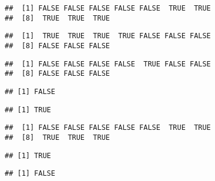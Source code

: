 \documentclass[paper=a4,10pt,div=17,headsepline,BCOR=12mm,twoside,open=right]{scrbook}\usepackage{knitr}
\begin{document}
\begin{knitrout}\footnotesize
{}\color{fgcolor}\begin{kframe}
\begin{alltt}
 \hlkwb{<-} \hlopt{:}
 \hlopt{>} 
\end{alltt}
\begin{verbatim}
##  [1] FALSE FALSE FALSE FALSE FALSE  TRUE  TRUE
##  [8]  TRUE  TRUE  TRUE
\end{verbatim}
\begin{alltt}
 \hlopt{<} 
\end{alltt}
\begin{verbatim}
##  [1]  TRUE  TRUE  TRUE  TRUE FALSE FALSE FALSE
##  [8] FALSE FALSE FALSE
\end{verbatim}
\begin{alltt}
 \hlopt{==} 
\end{alltt}
\begin{verbatim}
##  [1] FALSE FALSE FALSE FALSE  TRUE FALSE FALSE
##  [8] FALSE FALSE FALSE
\end{verbatim}
\begin{alltt}
 \hlopt{>} \hlstd{)}
\end{alltt}
\begin{verbatim}
## [1] FALSE
\end{verbatim}
\begin{alltt}
 \hlopt{>} \hlstd{)}
\end{alltt}
\begin{verbatim}
## [1] TRUE
\end{verbatim}
\begin{alltt}
 \hlkwb{<-}  \hlopt{>} 
\end{alltt}
\begin{verbatim}
##  [1] FALSE FALSE FALSE FALSE FALSE  TRUE  TRUE
##  [8]  TRUE  TRUE  TRUE
\end{verbatim}
\begin{alltt}
\end{alltt}
\begin{verbatim}
## [1] TRUE
\end{verbatim}
\begin{alltt}
\end{alltt}
\begin{verbatim}
## [1] FALSE
\end{verbatim}
\end{kframe}
\end{knitrout}
\end{document}
